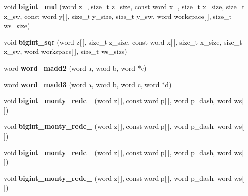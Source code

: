 \begin{DoxyCompactItemize}
\item 
\mbox{\label{namespace_botan_a4b73ab3c85a16543c15c3a307f381998}} 
void {\bfseries bigint\+\_\+mul} (word z\mbox{[}$\,$\mbox{]}, size\+\_\+t z\+\_\+size, const word x\mbox{[}$\,$\mbox{]}, size\+\_\+t x\+\_\+size, size\+\_\+t x\+\_\+sw, const word y\mbox{[}$\,$\mbox{]}, size\+\_\+t y\+\_\+size, size\+\_\+t y\+\_\+sw, word workspace\mbox{[}$\,$\mbox{]}, size\+\_\+t ws\+\_\+size)
\item 
\mbox{\label{namespace_botan_a416511ccb202ccb0ba5706e67bd82bdc}} 
void {\bfseries bigint\+\_\+sqr} (word z\mbox{[}$\,$\mbox{]}, size\+\_\+t z\+\_\+size, const word x\mbox{[}$\,$\mbox{]}, size\+\_\+t x\+\_\+size, size\+\_\+t x\+\_\+sw, word workspace\mbox{[}$\,$\mbox{]}, size\+\_\+t ws\+\_\+size)
\item 
\mbox{\label{namespace_botan_aa514bc78b9f0d9357573283e43efda66}} 
word {\bfseries word\+\_\+madd2} (word a, word b, word $\ast$c)
\item 
\mbox{\label{namespace_botan_a7619806b10d1b3e4f18da3a48f11138b}} 
word {\bfseries word\+\_\+madd3} (word a, word b, word c, word $\ast$d)
\item 
\mbox{\label{namespace_botan_aafd7e8bdca06264c6618d623449fb12b}} 
void {\bfseries bigint\+\_\+monty\+\_\+redc\+\_} (word z\mbox{[}$\,$\mbox{]}, const word p\mbox{[}$\,$\mbox{]}, word p\+\_\+dash, word ws\mbox{[}$\,$\mbox{]})
\item 
\mbox{\label{namespace_botan_ad25af6d3eb409a844145f2a9700acc69}} 
void {\bfseries bigint\+\_\+monty\+\_\+redc\+\_} (word z\mbox{[}$\,$\mbox{]}, const word p\mbox{[}$\,$\mbox{]}, word p\+\_\+dash, word ws\mbox{[}$\,$\mbox{]})
\item 
\mbox{\label{namespace_botan_a9287bd9b06abfbe9bf381bf6c2afd540}} 
void {\bfseries bigint\+\_\+monty\+\_\+redc\+\_} (word z\mbox{[}$\,$\mbox{]}, const word p\mbox{[}$\,$\mbox{]}, word p\+\_\+dash, word ws\mbox{[}$\,$\mbox{]})
\item 
\mbox{\label{namespace_botan_aa5b90ddb705000e79c5ca5fa2b8d6772}} 
void {\bfseries bigint\+\_\+monty\+\_\+redc\+\_} (word z\mbox{[}$\,$\mbox{]}, const word p\mbox{[}$\,$\mbox{]}, word p\+\_\+dash, word ws\mbox{[}$\,$\mbox{]})

\end{DoxyCompactItemize}

